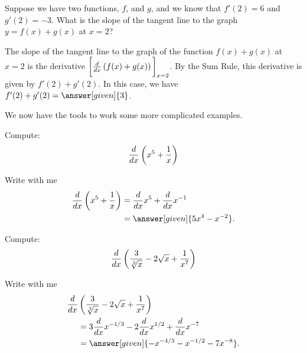 \documentclass{ximera}
\begin{document}
\begin{example}
  Suppose we have two functions, $f$, and $g$, and we know that $f'(2) = 6$ and $g'(2) = -3$.
  What is the slope of the tangent line to the graph $y=f(x) + g(x)$ at $x = 2$?
  \begin{explanation}
  	 The slope of the tangent line to the graph of the function $f(x) + g(x)$ at $x = 2$ is the derivative $ \bigg[ \frac{d}{\mathop{}\!d x} \left(f(x)+g(x)\right) \bigg]_{x=2}$. 
  	 By the Sum Rule, this derivative is given by $f'(2) + g'(2)$.   In this case, we have $f'(2) + g'(2) = \answer[given]{3}$.
  \end{explanation}
\end{example} 


We now have the tools to work some more complicated examples. 


\begin{example}
	Compute:
	\[
	\frac{d}{\mathop{}\!d x} \left( x^5+\frac{1}{x}\right)
	\] 
	\begin{explanation}
		Write with me
		\begin{align*}
			\ddx \left(x^5+\frac{1}{x}\right) &= \ddx x^5 + \ddx x^{-1} \\
				&=\answer[given]{5x^4 - x^{-2}}.
		\end{align*}
	\end{explanation}
\end{example}

\begin{example}
	Compute:
	\[
	\frac{d}{\mathop{}\!d x} \left(\frac{3}{\sqrt[3]{x}}-2\sqrt{x}+\frac{1}{x^7}\right)
	\]
	\begin{explanation}
		Write with me
		\begin{align*}
			  \ddx &\left(\frac{3}{\sqrt[3]{x}}-2\sqrt{x}+\frac{1}{x^7}\right)\\
			  &= 3\ddx x^{-1/3} -2\ddx x^{1/2}+\ddx x^{-7}\\
			  &=\answer[given]{-x^{-4/3} - x^{-1/2}-7x^{-8}}.
		\end{align*}
	\end{explanation}
\end{example}
\end{document}
